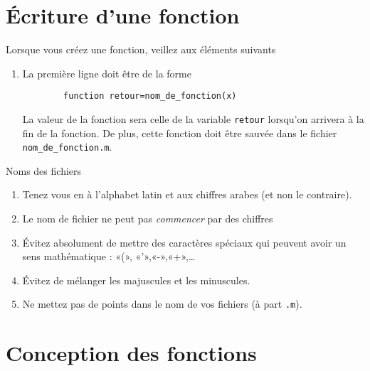 \section{Écriture d'une fonction}

Lorsque vous créez une fonction, veillez aux éléments suivants 
\begin{enumerate}

	\item
		La première ligne doit être de la forme
		\begin{verbatim}
		function retour=nom_de_fonction(x)
		\end{verbatim}
		La valeur de la fonction sera celle de la variable \verb+retour+ lorsqu'on arrivera à la fin de la fonction. De plus, cette fonction doit être sauvée dans le fichier \verb+nom_de_fonction.m+.

\end{enumerate}

Noms des fichiers
\begin{enumerate}
	\item
		Tenez vous en à l'alphabet latin et aux chiffres arabes (et non le contraire).
	\item
		Le nom de fichier ne peut pas \emph{commencer} par des chiffres
	\item
		Évitez absolument de mettre des caractères spéciaux qui peuvent avoir un sens mathématique : «(», «'»,«-»,«+»,\ldots
	\item
		Évitez de mélanger les majuscules et les minuscules. %
	\item
		Ne mettez pas de points dans le nom de vos fichiers (à part \verb+.m+).
\end{enumerate}

\section{Conception des fonctions}

